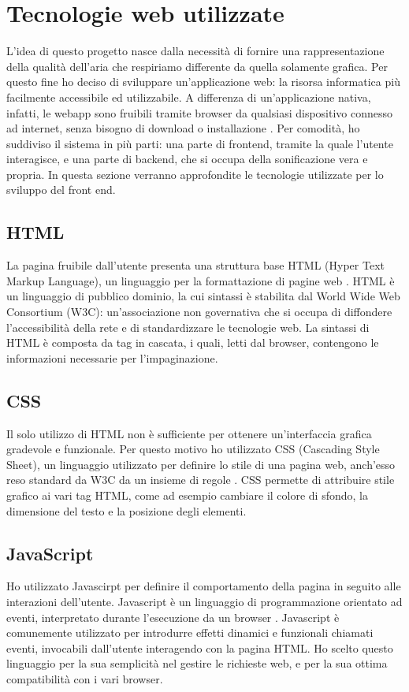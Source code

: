 \section{Tecnologie web utilizzate}
L'idea di questo progetto nasce dalla necessità di fornire una rappresentazione della qualità dell'aria che respiriamo differente da quella solamente grafica.
Per questo fine ho deciso di sviluppare un'applicazione web: la risorsa informatica più facilmente accessibile ed utilizzabile.
A differenza di un'applicazione nativa, infatti, le webapp sono fruibili tramite browser da qualsiasi dispositivo connesso ad internet, senza bisogno di download o installazione \cite{appdiffs}.
Per comodità, ho suddiviso il sistema in più parti: una parte di frontend, tramite la quale l'utente interagisce, e una parte di backend, che si occupa della sonificazione vera e propria.
In questa sezione verranno approfondite le tecnologie utilizzate per lo sviluppo del front end.

\subsection{HTML}
La pagina fruibile dall'utente presenta una struttura base HTML (Hyper Text Markup Language), un linguaggio per la formattazione di pagine web \cite{html}.
HTML è un linguaggio di pubblico dominio, la cui sintassi è stabilita dal World Wide Web Consortium (W3C): un'associazione non governativa che si occupa di diffondere l'accessibilità della rete e di standardizzare le tecnologie web.
La sintassi di HTML è composta da tag in cascata, i quali, letti dal browser, contengono le informazioni necessarie per l'impaginazione.

\subsection{CSS}
Il solo utilizzo di HTML non è sufficiente per ottenere un'interfaccia grafica gradevole e funzionale.
Per questo motivo ho utilizzato CSS (Cascading Style Sheet), un linguaggio utilizzato per definire lo stile di una pagina web, anch'esso reso standard da W3C da un insieme di regole \cite{css}.
CSS permette di attribuire stile grafico ai vari tag HTML, come ad esempio cambiare il colore di sfondo, la dimensione del testo e la posizione degli elementi.

\subsection{JavaScript}
Ho utilizzato Javascirpt per definire il comportamento della pagina in seguito alle interazioni dell'utente.
Javascript è un linguaggio di programmazione orientato ad eventi, interpretato durante l'esecuzione da un browser \cite{javascript}.
Javascript è comunemente utilizzato per introdurre effetti dinamici e funzionali chiamati eventi, invocabili dall'utente interagendo con la pagina HTML.
Ho scelto questo linguaggio per la sua semplicità nel gestire le richieste web, e per la sua ottima compatibilità con i vari browser.

